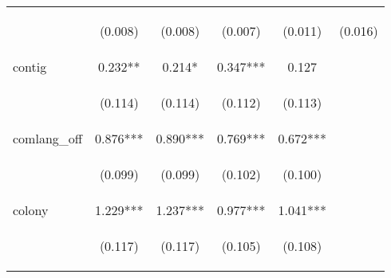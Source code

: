 \begin{center}
\begin{tabular}{lccccc}
\vspace{4pt} & \begin{footnotesize}(0.008)\end{footnotesize} & \begin{footnotesize}(0.008)\end{footnotesize} & \begin{footnotesize}(0.007)\end{footnotesize} & \begin{footnotesize}(0.011)\end{footnotesize} & \begin{footnotesize}(0.016)\end{footnotesize} \\
contig & 0.232** & 0.214* & 0.347*** & 0.127 &  \\
\vspace{4pt} & \begin{footnotesize}(0.114)\end{footnotesize} & \begin{footnotesize}(0.114)\end{footnotesize} & \begin{footnotesize}(0.112)\end{footnotesize} & \begin{footnotesize}(0.113)\end{footnotesize} & \begin{footnotesize}\end{footnotesize} \\
comlang\_off & 0.876*** & 0.890*** & 0.769*** & 0.672*** &  \\
\vspace{4pt} & \begin{footnotesize}(0.099)\end{footnotesize} & \begin{footnotesize}(0.099)\end{footnotesize} & \begin{footnotesize}(0.102)\end{footnotesize} & \begin{footnotesize}(0.100)\end{footnotesize} & \begin{footnotesize}\end{footnotesize} \\
colony & 1.229*** & 1.237*** & 0.977*** & 1.041*** &  \\
\vspace{4pt} & \begin{footnotesize}(0.117)\end{footnotesize} & \begin{footnotesize}(0.117)\end{footnotesize} & \begin{footnotesize}(0.105)\end{footnotesize} & \begin{footnotesize}(0.108)\end{footnotesize} & \begin{footnotesize}\end{footnotesize} \\

\end{tabular}
\end{center}
